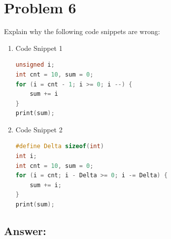 
\section*{Problem 6}

Explain why the following code snippets are wrong:

\begin{enumerate}
    \item Code Snippet 1
\begin{lstlisting}[frame=tb, language=C++]
unsigned i; 
int cnt = 10, sum = 0; 
for (i = cnt - 1; i >= 0; i --) {
    sum += i
}
print(sum);
\end{lstlisting}

    \item Code Snippet 2
\begin{lstlisting}[frame=tb, language=C++]
#define Delta sizeof(int)
int i; 
int cnt = 10, sum = 0; 
for (i = cnt; i - Delta >= 0; i -= Delta) {
    sum += i;
} 
print(sum);
\end{lstlisting}
\end{enumerate}

\subsection*{Answer:}
